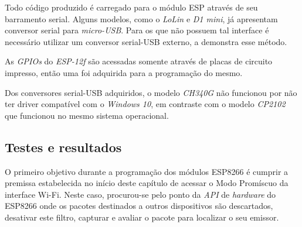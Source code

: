 \begin{table}[htb]
\end{table}

Todo código produzido é carregado para o módulo ESP através de seu barramento
serial. Alguns modelos, como o \emph{LoLin} e \emph{D1 mini}, já apresentam
conversor serial para \emph{micro-USB}. Para os que não possuem tal interface é
necessário utilizar um conversor serial-USB externo, a
 demonstra esse método.

As \emph{GPIOs} do \emph{ESP-12f} são acessadas somente através de placas
de circuito impresso, então uma foi adquirida para a programação do mesmo.

Dos conversores serial-USB adquiridos, o modelo \emph{CH340G} não funcionou por
não ter driver compatível com o \emph{Windows 10}, em contraste com o modelo
\emph{CP2102}  que funcionou no mesmo sistema operacional.


\subsection{Testes e resultados}
\label{subsec:mercado-esp}

O primeiro objetivo durante a programação dos módulos ESP8266 é cumprir a
premissa  estabelecida no início deste capítulo de acessar o Modo Promíscuo da
interface Wi-Fi. Neste caso, procurou-se pelo ponto da \emph{API} de
\emph{hardware} do ESP8266 onde os pacotes destinados a outros dispositivos são
descartados, desativar este filtro, capturar e avaliar o pacote para localizar o
seu emissor.

